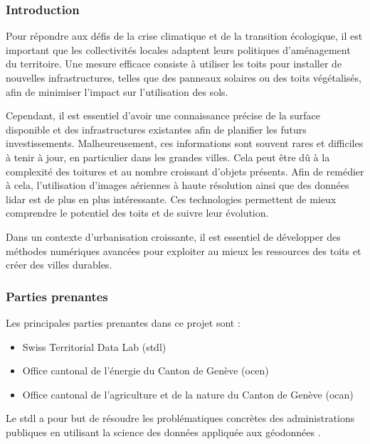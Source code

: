 \subsubsection{Introduction}

\par{Pour répondre aux défis de la crise climatique et de la transition écologique, il est important que les collectivités locales adaptent leurs politiques d'aménagement du territoire. Une mesure efficace consiste à utiliser les toits pour installer de nouvelles infrastructures, telles que des panneaux solaires ou des toits végétalisés, afin de minimiser l'impact sur l'utilisation des sols.}
\par{Cependant, il est essentiel d'avoir une connaissance précise de la surface disponible et des infrastructures existantes afin de planifier les futurs investissements. Malheureusement, ces informations sont souvent rares et difficiles à tenir à jour, en particulier dans les grandes villes. Cela peut être dû à la complexité des toitures et au nombre croissant d'objets présents. Afin de remédier à cela, l'utilisation d'images aériennes à haute résolution ainsi que des données \gls{lidar} est de plus en plus intéressante. Ces technologies permettent de mieux comprendre le potentiel des toits et de suivre leur évolution.}
\par{Dans un contexte d'urbanisation croissante, il est essentiel de développer des méthodes numériques avancées pour exploiter au mieux les ressources des toits et créer des villes durables.}

\subsubsection{Parties prenantes}

\par{Les principales parties prenantes dans ce projet sont :}
\begin{itemize}
\item Swiss Territorial Data Lab (\acrshort{stdl})
\item Office cantonal de l'énergie du Canton de Genève (\acrshort{ocen})
\item Office cantonal de l'agriculture et de la nature du Canton de Genève (\acrshort{ocan})
\end{itemize}

\par{Le \acrshort{stdl} a pour but de résoudre les problématiques concrètes des administrations publiques en utilisant la science des données appliquée aux géodonnées \cite{stdl_swiss_nodate}.}

